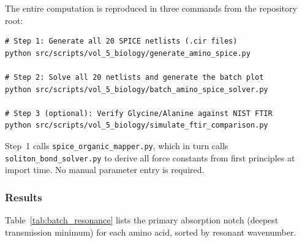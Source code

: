 The entire computation is reproduced in three commands from the repository root:

\begin{verbatim}
# Step 1: Generate all 20 SPICE netlists (.cir files)
python src/scripts/vol_5_biology/generate_amino_spice.py

# Step 2: Solve all 20 netlists and generate the batch plot
python src/scripts/vol_5_biology/batch_amino_spice_solver.py

# Step 3 (optional): Verify Glycine/Alanine against NIST FTIR
python src/scripts/vol_5_biology/simulate_ftir_comparison.py
\end{verbatim}

\noindent Step~1 calls \texttt{spice\_organic\_mapper.py}, which in turn calls \texttt{soliton\_bond\_solver.py} to derive all force constants from first principles at import time. No manual parameter entry is required.

\subsubsection{Results}

Table~\ref{tab:batch_resonance} lists the primary absorption notch (deepest transmission minimum) for each amino acid, sorted by resonant wavenumber.

